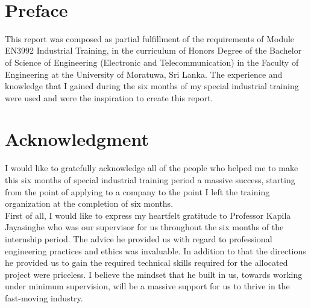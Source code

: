 \documentclass[a4paper,12pt]{report}
\begin{document}
	
\onehalfspacing	
\pagecolor{lightpink}

\pagecolor{white} %



\newpage \
\thispagestyle{empty}
\newpage
{} %

%

\chapter*{Preface}
This report was composed as partial fulfillment of the requirements of Module EN3992 Industrial Training, in the curriculum of Honors Degree of the Bachelor of Science of Engineering (Electronic and Telecommunication) in the Faculty of Engineering at the University of Moratuwa, Sri Lanka. The experience and knowledge that I gained during the six months of my special industrial training were used and were the inspiration to create this report.\\

 

\cleardoublepage



\chapter*{Acknowledgment}

I would like to gratefully acknowledge all of the people who helped me to make this six months of special industrial training period a massive success, starting from the point of applying to a company to the point I left the training organization at the completion of six months.\\

First of all, I would like to express my heartfelt gratitude to Professor Kapila Jayasinghe who was our supervisor for us throughout the six months of the internship period. The advice he provided us with regard to professional engineering practices and ethics was invaluable. In addition to that the directions he provided us to gain the required technical skills required for the allocated project were priceless. I believe the mindset that he built in us, towards working under minimum supervision, will be a massive support for us to thrive in the fast-moving industry.\\
\end{document}
